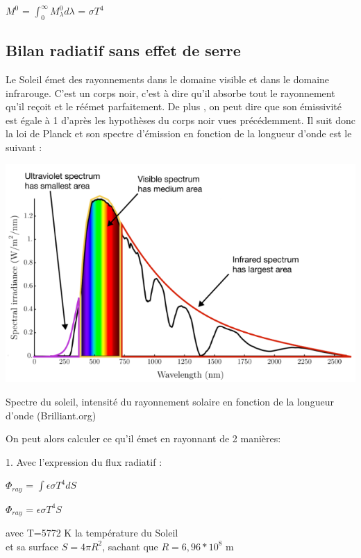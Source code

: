 \documentclass[a4paper, 12pt]{report} %
\begin{document}
\hfil $M^{0}$ = $\int_{0}^{\infty} M^{0}_\lambda d\lambda$ = $\sigma T^{4}$ 

\par

\subsection{Bilan radiatif sans effet de serre} 

Le Soleil émet des rayonnements dans le domaine visible et 
dans le domaine infrarouge. C'est un corps noir, c'est à dire
qu'il absorbe tout le rayonnement qu'il reçoit et le réémet 
parfaitement. De plus , on peut dire que son émissivité est 
égale à 1 d'après les hypothèses du corps noir vues précédemment. Il suit donc la loi de Planck et son spectre d'émission en fonction de 
la longueur d'onde est le suivant : 
\begin{center}
    \includegraphics[scale=0.85]{Images/Spectre Soleil.png}
    
    Spectre du soleil, intensité du rayonnement solaire en fonction de la longueur d’onde (Brilliant.org)  
\end{center} \vspace{\baselineskip}

\noindent On peut alors calculer ce qu'il émet en rayonnant de 2 manières: \vspace{\baselineskip}

1. Avec l'expression du flux radiatif :
\begin{center}
$\Phi_{ray}$ = $\int \epsilon \sigma T^{4} dS$    
\end{center}
\begin{center}
$\Phi_{ray}$ = $\epsilon \sigma T^{4} S$    
\end{center}
avec T=5772 K la température du Soleil \\
et sa surface $S=4 \pi R^{2}$, sachant que $R= 6,96*10^{8}$ m 
\vspace{\baselineskip}
\end{document}
